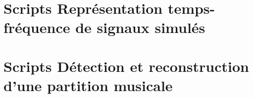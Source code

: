 \documentclass[12pt,a4paper,titlepage]{article}
\begin{document}
\begin{appendices}

    \section{Scripts Représentation temps-fréquence de signaux simulés}

    

    \section{Scripts Détection et reconstruction d'une partition musicale}

    

\end{appendices}
\end{document}
